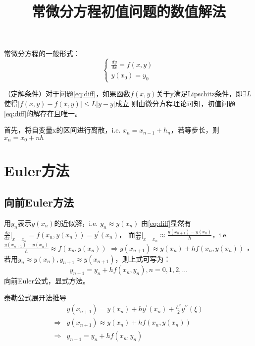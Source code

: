 \documentclass{article}
\begin{document}
\title{常微分方程初值问题的数值解法}
\author{}
\date{}
\maketitle

常微分方程的一般形式：
\begin{equation}
    \left\{
        \begin{array}{lr}
            \frac{dy}{dx} = f(x, y) \\
            y(x_0) = y_0
        \end{array}
        \right. 
\label{eq:diff}
\end{equation}

（定解条件）对于问题\ref{eq:diff}，如果函数$f(x,y)$关于y满足Lipschitz条件，即$\exists L$使得$|f(x,y)-f(x,\overline{y})|\le L|y-\overline{y}|$成立
则由微分方程理论可知，初值问题\ref{eq:diff}的解存在且唯一。

首先，将自变量x的区间进行离散，i.e. $x_n = x_{n-1} + h_n$，若等步长，则$x_n = x_0 + nh$

\section{Euler方法}
\subsection{向前Euler方法}
用$y_n$表示$y(x_n)$的近似解，i.e. $y_n \approx y(x_n)$
由\ref{eq:diff}显然有$\frac{dy}{dx}|_{x=x_n} = f(x_n, y(x_n)) = y^{'}(x_n)$，
而$\frac{dy}{dx}|_{x=x_n} \approx \frac{y(x_{n+1}) - y(x_n)}{h}$，i.e. $\frac{y(x_{n+1}) - y(x_n)}{h} \approx f(x_n, y(x_n))$
$\Rightarrow y(x_{n+1}) \approx y(x_n) + hf(x_n, y(x_n))$ ，若用$y_n\approx y(x_n), y_{n+1}\approx y(x_{n+1})$，则上式可写为：
\begin{equation}
    y_{n+1}=y_n+hf(x_n, y_n), n=0,1,2,\dots 
    \label{eq:euler}
\end{equation}
向前Euler公式，显式方法。

泰勒公式展开法推导
\begin{equation*}
    \begin{split}
        &y(x_{n+1}) = y(x_n) + hy^{'}(x_n) +\frac{h^2}{2}y^{{'}{'}}(\xi) \\
        \Rightarrow& y(x_{n+1}) \approx y(x_n)+hf(x_n, y(x_n)) \\
        \Rightarrow& 
        y_{n+1} = y_n +hf(x_n, y_n)
    \end{split}
\end{equation*}
\end{document}
